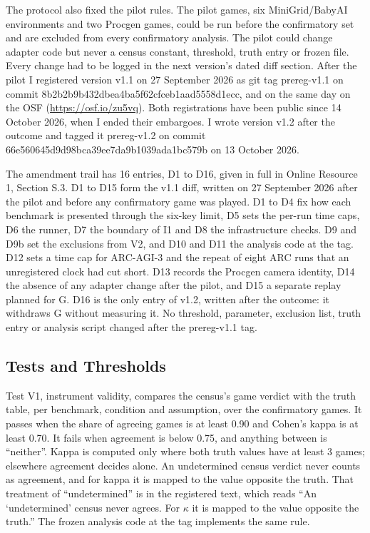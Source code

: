 \documentclass[twocolumn]{svjour3}
\begin{document}
The protocol also fixed the pilot rules. The pilot games, six
MiniGrid/BabyAI environments and two Procgen games, could be run before
the confirmatory set and are excluded from every confirmatory analysis.
The pilot could change adapter code but never a census constant,
threshold, truth entry or frozen file. Every change had to be logged in
the next version's dated diff section. After the pilot I registered
version v1.1 on 27 September 2026 as git tag prereg-v1.1 on commit
8b2b2b9b\allowbreak{}432dbea4\allowbreak{}ba5f62cf\allowbreak{}ceb1aad5\allowbreak{}558d1ecc,
and on the same day on the OSF (\url{https://osf.io/zu5vq}). Both
registrations have been public since 14 October 2026, when I ended their
embargoes. I wrote version v1.2 after the outcome and tagged it
prereg-v1.2 on commit
66e56064\allowbreak{}5d9d98bc\allowbreak{}a39ee7da\allowbreak{}9b1039ad\allowbreak{}a1bc579b
on 13 October 2026.

The amendment trail has 16 entries, D1 to D16, given in full in Online
Resource 1, Section S.3. D1 to D15 form the v1.1 diff, written on 27
September 2026 after the pilot and before any confirmatory game was
played. D1 to D4 fix how each benchmark is presented through the six-key
limit, D5 sets the per-run time caps, D6 the runner, D7 the boundary of
I1 and D8 the infrastructure checks. D9 and D9b set the exclusions from
V2, and D10 and D11 the analysis code at the tag. D12 sets a time cap
for ARC-AGI-3 and the repeat of eight ARC runs that an unregistered
clock had cut short. D13 records the Procgen camera identity, D14 the
absence of any adapter change after the pilot, and D15 a separate replay
planned for G. D16 is the only entry of v1.2, written after the outcome:
it withdraws G without measuring it. No threshold, parameter, exclusion
list, truth entry or analysis script changed after the prereg-v1.1 tag.

\subsection{Tests and Thresholds}\label{sec:tests}

Test V1, instrument validity, compares the census's game verdict with
the truth table, per benchmark, condition and assumption, over the
confirmatory games. It passes when the share of agreeing games is at
least 0.90 and Cohen's kappa is at least 0.70. It fails when agreement
is below 0.75, and anything between is ``neither''. Kappa is computed
only where both truth values have at least 3 games; elsewhere agreement
decides alone. An undetermined census verdict never counts as agreement,
and for kappa it is mapped to the value opposite the truth. That
treatment of ``undetermined'' is in the registered text, which reads
``An `undetermined' census never agrees. For \(\kappa\) it is mapped to
the value opposite the truth.'' The frozen analysis code at the tag
implements the same rule.
\end{document}
